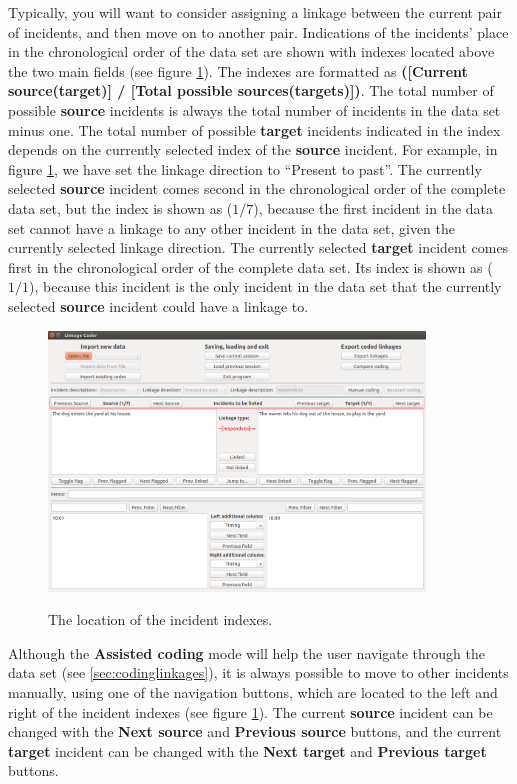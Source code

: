 \documentclass{memoir}
\begin{document}
Typically, you will want to consider assigning a linkage between the current pair of incidents, and then move on to another pair. Indications of the incidents' place in the chronological order of the data set are shown with indexes located above the two main fields (see figure \ref{fig:indexes}). The indexes are formatted as \textbf{([Current source(target)] / [Total possible sources(targets)])}. The total number of possible \textbf{source} incidents is always the total number of incidents in the data set minus one. The total number of possible \textbf{target} incidents indicated in the index depends on the currently selected index of the \textbf{source} incident. For example, in figure \ref{fig:indexes}, we have set the linkage direction to ``Present to past''. The currently selected \textbf{source} incident comes second in the chronological order of the complete data set, but the index is shown as (\(1 / 7\)), because the first incident in the data set cannot have a linkage to any other incident in the data set, given the currently selected linkage direction. The currently selected \textbf{target} incident comes first in the chronological order of the complete data set. Its index is shown as (\(1 / 1\)), because this incident is the only incident in the data set that the currently selected \textbf{source} incident could have a linkage to.    

\begin{figure}[h!]
  \centering
  \caption{The location of the incident indexes.}
  \includegraphics[width=100mm]{Screenshot_7.pdf}
  \label{fig:indexes}
\end{figure}

Although the \textbf{Assisted coding} mode will help the user navigate through the data set (see \ref{sec:codinglinkages}), it is always possible to move to other incidents manually, using one of the navigation buttons, which are located to the left and right of the incident indexes (see figure \ref{fig:indexes}). The current \textbf{source} incident can be changed with the \textbf{Next source} and \textbf{Previous source} buttons, and the current \textbf{target} incident can be changed with the \textbf{Next target} and \textbf{Previous target} buttons.
\end{document}
